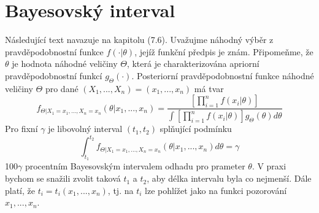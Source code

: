 \section{Bayesovský interval}

Následující text navazuje na kapitolu (7.6). Uvažujme náhodný výběr z pravděpodobnostní funkce $f(\cdot|\theta)$, jejíž funkční předpis je znám. Připomeňme, že $\theta$ je hodnota náhodné veličiny $\Theta$, která je charakterizována apriorní pravděpodobnostní funkcí $g_{\Theta}(\cdot)$. Posteriorní pravděpodobnostní funkce náhodné veličiny $\Theta$ pro dané $(X_1, ..., X_n) = (x_1, ..., x_n)$ má tvar
\begin{equation*}
f_{\Theta|X_1 = x_1, ..., X_n = x_n}(\theta|x_1, ..., x_n) = \frac{\left[\prod_{i = 1}^n f(x_i|\theta) \right]}{\int \left[\prod_{i = 1}^n f(x_i|\theta) \right]g_{\Theta}(\theta)d\theta}
\end{equation*}
Pro fixní $\gamma$ je libovolný interval $(t_1, t_2)$ splňující podmínku
\begin{equation*}
\int_{t_1}^{t_2}f_{\Theta|X_1 = x_1, ..., X_n = x_n}(\theta|x_1, ..., x_n)d\theta = \gamma
\end{equation*}
100$\gamma$ procentním Bayesovským intervalem odhadu pro prameter $\theta$. V praxi bychom se snažili zvolit taková $t_1$ a $t_2$, aby délka intervalu byla co nejmenší. Dále platí, že $t_i = \mathit{t_i}(x_1, ..., x_n)$, tj. na $t_i$ lze pohlížet jako na funkci pozorování $x_1, ..., x_n$.

